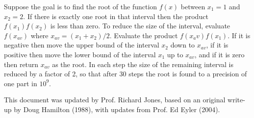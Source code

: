 \documentclass{revtex4}
\begin{document}
Suppose the goal is to find the root of the function $f(x)$ between $x_1 = 1$
and $x_2 = 2$. If there is exactly one root in that interval then the
product $f(x_1)f(x_2)$ is less than zero. To reduce the size of the interval,
evaluate $f(x_{av})$ where $x_{av} = (x_1 + x_2)/2$. Evaluate the product
$f(x_av)f(x_1)$.  If it is negative then move the upper bound of the interval
$x_2$ down to $x_{av}$, if it is positive then move the lower bound of the
interval $x_1$ up to $x_{av}$, and if it is zero then return $x_{av}$
as the root. In each step the size of the remaining interval is reduced by
a factor of 2, so that after 30 steps the root is found to a precision of one
part in $10^{9}$.

\begin{acknowledgments}
This document was updated by Prof. Richard Jones, based on an original
write-up by Doug Hamilton (1988), with updates from Prof. Ed Eyler (2004).
\end{acknowledgments}

%

\end{document}

